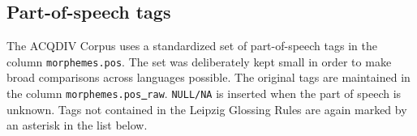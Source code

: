 \documentclass[a4paper, 11pt]{book}
\newcommand{\und}{\underline{{ }}\hspace{0.2mm}}	%
\begin{document}

\subsection{Part-of-speech tags}
\label{subsec:Part-of-speech tags}

The ACQDIV Corpus uses a standardized set of part-of-speech tags in the column \texttt{morphemes.pos}. The set was deliberately kept small in order to make broad comparisons across languages possible. The original tags are maintained in the column \texttt{morphemes.pos\und raw}. \texttt{NULL/NA} is inserted when the part of speech is unknown. Tags not contained in the Leipzig Glossing Rules are again marked by an asterisk in the list below.
\end{document}
